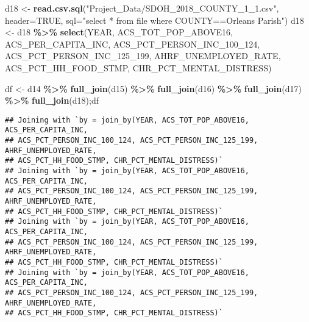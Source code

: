 \documentclass[
]{article}
\newenvironment{Shaded}{\begin{snugshade}}{\end{snugshade}}
\newcommand{\AttributeTok}[1]{\textcolor[rgb]{0.13,0.29,0.53}{#1}}
\newcommand{\ConstantTok}[1]{\textcolor[rgb]{0.56,0.35,0.01}{#1}}
\newcommand{\FunctionTok}[1]{\textcolor[rgb]{0.13,0.29,0.53}{\textbf{#1}}}
\newcommand{\NormalTok}[1]{#1}
\newcommand{\OtherTok}[1]{\textcolor[rgb]{0.56,0.35,0.01}{#1}}
\newcommand{\SpecialCharTok}[1]{\textcolor[rgb]{0.81,0.36,0.00}{\textbf{#1}}}
\newcommand{\StringTok}[1]{\textcolor[rgb]{0.31,0.60,0.02}{#1}}
\begin{document}
\begin{Shaded}
\begin{Highlighting}[]
  
\NormalTok{d18 }\OtherTok{\textless{}{-}} \FunctionTok{read.csv.sql}\NormalTok{(}\StringTok{"Project\_Data/SDOH\_2018\_COUNTY\_1\_1.csv"}\NormalTok{, }\AttributeTok{header=}\ConstantTok{TRUE}\NormalTok{, }
                    \AttributeTok{sql=}\StringTok{"select * from file where COUNTY==\textquotesingle{}Orleans Parish\textquotesingle{}"}\NormalTok{)}
\NormalTok{  d18 }\OtherTok{\textless{}{-}}\NormalTok{ d18 }\SpecialCharTok{\%\textgreater{}\%} \FunctionTok{select}\NormalTok{(YEAR, ACS\_TOT\_POP\_ABOVE16, ACS\_PER\_CAPITA\_INC, ACS\_PCT\_PERSON\_INC\_100\_124, ACS\_PCT\_PERSON\_INC\_125\_199, AHRF\_UNEMPLOYED\_RATE, ACS\_PCT\_HH\_FOOD\_STMP, CHR\_PCT\_MENTAL\_DISTRESS)}
  
\NormalTok{df }\OtherTok{\textless{}{-}}\NormalTok{ d14 }\SpecialCharTok{\%\textgreater{}\%} \FunctionTok{full\_join}\NormalTok{(d15) }\SpecialCharTok{\%\textgreater{}\%} \FunctionTok{full\_join}\NormalTok{(d16) }\SpecialCharTok{\%\textgreater{}\%} \FunctionTok{full\_join}\NormalTok{(d17) }\SpecialCharTok{\%\textgreater{}\%} \FunctionTok{full\_join}\NormalTok{(d18);df}
\end{Highlighting}
\end{Shaded}

\begin{verbatim}
## Joining with `by = join_by(YEAR, ACS_TOT_POP_ABOVE16, ACS_PER_CAPITA_INC,
## ACS_PCT_PERSON_INC_100_124, ACS_PCT_PERSON_INC_125_199, AHRF_UNEMPLOYED_RATE,
## ACS_PCT_HH_FOOD_STMP, CHR_PCT_MENTAL_DISTRESS)`
## Joining with `by = join_by(YEAR, ACS_TOT_POP_ABOVE16, ACS_PER_CAPITA_INC,
## ACS_PCT_PERSON_INC_100_124, ACS_PCT_PERSON_INC_125_199, AHRF_UNEMPLOYED_RATE,
## ACS_PCT_HH_FOOD_STMP, CHR_PCT_MENTAL_DISTRESS)`
## Joining with `by = join_by(YEAR, ACS_TOT_POP_ABOVE16, ACS_PER_CAPITA_INC,
## ACS_PCT_PERSON_INC_100_124, ACS_PCT_PERSON_INC_125_199, AHRF_UNEMPLOYED_RATE,
## ACS_PCT_HH_FOOD_STMP, CHR_PCT_MENTAL_DISTRESS)`
## Joining with `by = join_by(YEAR, ACS_TOT_POP_ABOVE16, ACS_PER_CAPITA_INC,
## ACS_PCT_PERSON_INC_100_124, ACS_PCT_PERSON_INC_125_199, AHRF_UNEMPLOYED_RATE,
## ACS_PCT_HH_FOOD_STMP, CHR_PCT_MENTAL_DISTRESS)`
\end{verbatim}
\end{document}
